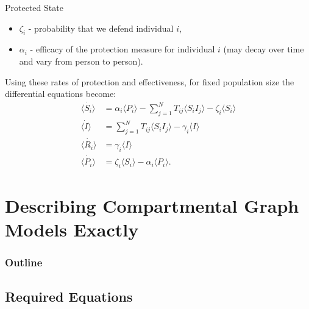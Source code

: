 \documentclass[unknownkeysallowed]{beamer}
\begin{document}
\begin{frame}{Protected State}
\begin{itemize}
	\item $\zeta_i$ - probability that we defend individual $i$,
	\item $\alpha_i$ - efficacy of the protection measure for individual $i$ (may decay over time and vary from person to person). 	
\end{itemize}
\pause
Using these rates of protection and effectiveness, for fixed population size the differential equations become:
\pause
\begin{align}
\dot{\langle S_i \rangle} & = \alpha_i \langle P_i \rangle - \sum^{N}_{j=1}T_{ij} \langle S_i I_j \rangle - \zeta_i\langle S_i \rangle\\
\dot{\langle I \rangle} & =\sum^{N}_{j=1}T_{ij}\langle S_i I_j \rangle - \gamma_i \langle I \rangle \\
\dot{\langle R_i \rangle} & = \gamma_i \langle I \rangle \\
\dot{\langle P_i \rangle} & = \zeta_i \langle S_i \rangle - \alpha_i \langle P_i \rangle.
\end{align} 

\end{frame}



\section{Describing Compartmental Graph Models Exactly}

\begin{frame}
  \frametitle{Outline}
  \tableofcontents[currentsection]
\end{frame}

\subsection{Required Equations}
\end{document}
